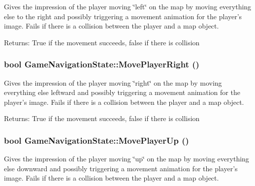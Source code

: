Gives the impression of the player moving \char`\"{}left\char`\"{} on the map by moving everything else to the right and possibly triggering a movement animation for the player's image. Fails if there is a collision between the player and a map object.

\begin{Desc}
\item[Returns:]True if the movement succeeds, false if there is collision \end{Desc}
\hypertarget{class_game_navigation_state_0b505a64bcf97883bb9e15d0d008174e}{
\subsubsection[{MovePlayerRight}]{\setlength{\rightskip}{0pt plus 5cm}bool GameNavigationState::MovePlayerRight ()}}
\label{class_game_navigation_state_0b505a64bcf97883bb9e15d0d008174e}


Gives the impression of the player moving \char`\"{}right\char`\"{} on the map by moving everything else leftward and possibly triggering a movement animation for the player's image. Fails if there is a collision between the player and a map object.

\begin{Desc}
\item[Returns:]True if the movement succeeds, false if there is collision \end{Desc}
\hypertarget{class_game_navigation_state_fd803365fe0a32b60cf9105ee45b4042}{
\subsubsection[{MovePlayerUp}]{\setlength{\rightskip}{0pt plus 5cm}bool GameNavigationState::MovePlayerUp ()}}
\label{class_game_navigation_state_fd803365fe0a32b60cf9105ee45b4042}


Gives the impression of the player moving \char`\"{}up\char`\"{} on the map by moving everything else downward and possibly triggering a movement animation for the player's image. Fails if there is a collision between the player and a map object.

